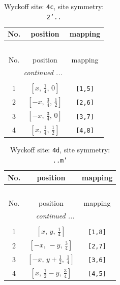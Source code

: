 \documentclass[fleqn,8pt]{jsarticle}
\begin{document}
\renewcommand{\arraystretch}{1.2}
\begin{longtable}{ccc}
\caption{Wyckoff site: {\tt 4c}, site symmetry: {\tt 2'..}}
 \\
 \hline \hline
No. & position & mapping \\ \hline \endfirsthead

\multicolumn{2}{l}{\tablename\ \thetable{}} \\
 \hline \hline
No. & position & mapping \\ \hline \endhead

 \hline \hline
\multicolumn{2}{r}{\footnotesize\it continued ...} \\ \endfoot

 \hline \hline
\multicolumn{2}{r}{} \\ \endlastfoot

1 & $\left[ x,\, \frac{1}{4},\, 0 \right]$ & {\tt [1,5]} \\ \hline
2 & $\left[ - x,\, \frac{3}{4},\, \frac{1}{2} \right]$ & {\tt [2,6]} \\ \hline
3 & $\left[ - x,\, \frac{3}{4},\, 0 \right]$ & {\tt [3,7]} \\ \hline
4 & $\left[ x,\, \frac{1}{4},\, \frac{1}{2} \right]$ & {\tt [4,8]} \\
\end{longtable}
\renewcommand{\arraystretch}{1.2}
\begin{longtable}{ccc}
\caption{Wyckoff site: {\tt 4d}, site symmetry: {\tt ..m'}}
 \\
 \hline \hline
No. & position & mapping \\ \hline \endfirsthead

\multicolumn{2}{l}{\tablename\ \thetable{}} \\
 \hline \hline
No. & position & mapping \\ \hline \endhead

 \hline \hline
\multicolumn{2}{r}{\footnotesize\it continued ...} \\ \endfoot

 \hline \hline
\multicolumn{2}{r}{} \\ \endlastfoot

1 & $\left[ x,\, y,\, \frac{1}{4} \right]$ & {\tt [1,8]} \\ \hline
2 & $\left[ - x,\, - y,\, \frac{3}{4} \right]$ & {\tt [2,7]} \\ \hline
3 & $\left[ - x,\, y + \frac{1}{2},\, \frac{1}{4} \right]$ & {\tt [3,6]} \\ \hline
4 & $\left[ x,\, \frac{1}{2} - y,\, \frac{3}{4} \right]$ & {\tt [4,5]} \\
\end{longtable}
\end{document}
